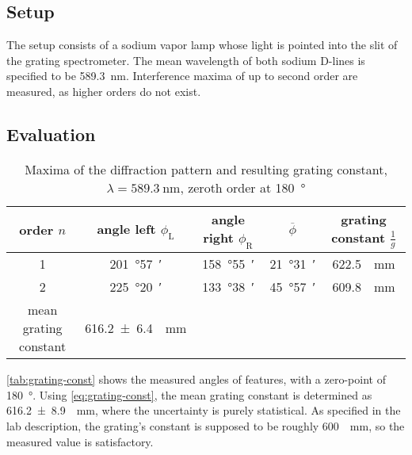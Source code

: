 \subsection{Setup}
The setup consists of a sodium vapor lamp whose light is pointed into the slit of the grating spectrometer.
The mean wavelength of both sodium D-lines is specified to be \SI{589.3}{\nm}.
Interference maxima of up to second order are measured, as higher orders do not exist.

\subsection{Evaluation}
\begin{table}[b!]
	\centering
	\caption[Maxima of the diffraction pattern and resulting grating constant]{Maxima of the diffraction pattern and resulting grating constant, $\lambda=\SI{589.3}{\nm}$, zeroth order at \SI{180}{\degree}}
	\label{tab:grating-const}
	\begin{tabular}{S|SSS|S}
		\toprule
		{order $n$}	&	{angle left $\phi_\text{L}$}	&	{angle right $\phi_\text{R}$}	&	{$\overline{\phi}$}	&	{grating constant $\frac{1}{g}$}\\
			&	\SI{201}{\degree}\SI{57}{\arcminute}	&	\SI{158}{\degree}\SI{55}{\arcminute}	&	\SI{21}{\degree}\SI{31}{\arcminute}	&	\SI{622.5}{\per\mm}	\\
			2	&	\SI{225}{\degree}\SI{20}{\arcminute}	&	\SI{133}{\degree}\SI{38}{\arcminute}	&	\SI{45}{\degree}\SI{57}{\arcminute}	&	\SI{609.8}{\per\mm}	\\
		\midrule
		{mean grating constant}	&	\SI{616.2(64)}{\per\mm}\\
		\bottomrule
	\end{tabular}
\end{table}

\autoref{tab:grating-const} shows the measured angles of features, with a zero-point of \SI{180}{\degree}.
Using \autoref{eq:grating-const}, the mean grating constant is determined as \SI{616.2(89)}{\per\mm}, where the uncertainty is purely statistical.
As specified in the lab description, the grating's constant is supposed to be roughly \SI{600}{\per\mm}, so the measured value is satisfactory.

